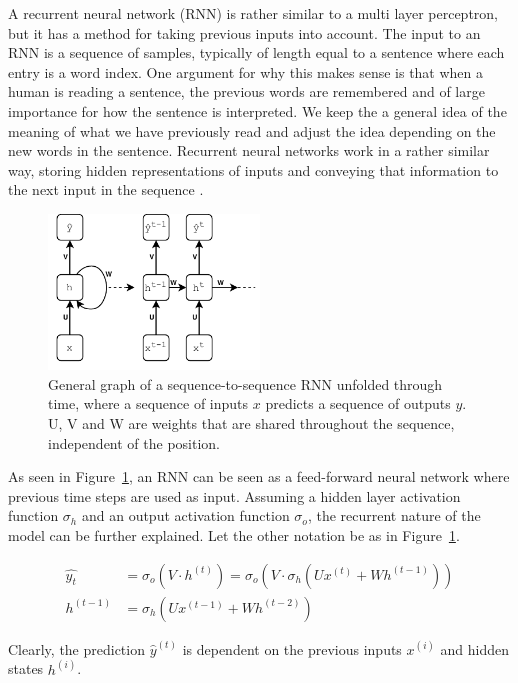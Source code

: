 A recurrent neural network (RNN) is rather similar to a multi layer perceptron, but it has a method for taking previous inputs into account. The input to an RNN is a sequence of samples, typically of length equal to a sentence where each entry is a word index. One argument for why this makes sense is that when a human is reading a sentence, the previous words are remembered and of large importance for how the sentence is interpreted. We keep the a general idea of the meaning of what we have previously read and adjust the idea depending on the new words in the sentence. Recurrent neural networks work in a rather similar way, storing hidden representations of inputs and conveying that information to the next input in the sequence \citep{Goodfellow-et-al-2016}. 

\begin{figure}[H]
    \centering
    \includegraphics[width=0.5\textwidth]{Figures/figs-simplernn.pdf}
    \caption{General graph of a sequence-to-sequence RNN unfolded through time, where a sequence of inputs $x$ predicts a sequence of outputs $y$. U, V and W are weights that are shared throughout the sequence, independent of the position.}
    \label{fig:rnn}
\end{figure}

As seen in Figure~\ref{fig:rnn}, an RNN can be seen as a feed-forward neural network where previous time steps are used as input. Assuming a hidden layer activation function $\sigma_h$ and an output activation function $\sigma_o$, the recurrent nature of the model can be further explained. Let the other notation be as in Figure~\ref{fig:rnn}. 

\begin{align}
    \hat{y_t} &= \sigma_o(V \cdot h^{(t)}) = \sigma_o(V \cdot  \sigma_h(U x^{(t)} + W h^{(t-1)})) \\
    h^{(t-1)} &= \sigma_h(Ux^{(t-1)} + W h^{(t-2)})
\end{align}

Clearly, the prediction $\hat{y}^{(t)}$ is dependent on the previous inputs $x^{(i)}$ and hidden states $h^{(i)}$. 

